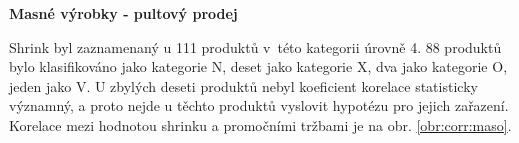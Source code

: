 
\textbf{Masné výrobky - pultový prodej}

Shrink byl zaznamenaný u 111 produktů v~této kategorii úrovně 4. 88 produktů bylo klasifikováno jako kategorie N, deset jako kategorie X, dva jako kategorie O, jeden jako V. U zbylých deseti produktů nebyl koeficient korelace statisticky významný, a proto nejde u těchto produktů vyslovit hypotézu pro jejich zařazení. Korelace mezi hodnotou shrinku a promočními tržbami je na obr. \ref*{obr:corr:maso}.

